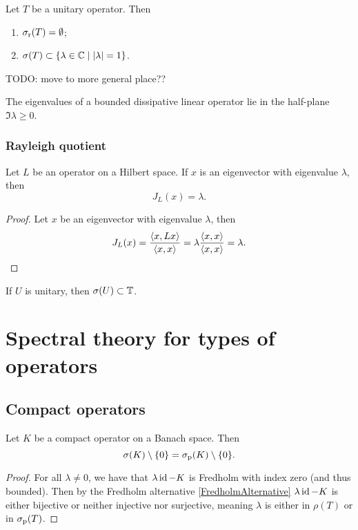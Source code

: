\begin{proposition}
Let $T$ be a unitary operator. Then
\begin{enumerate}
\item $\sigma_\text{r}(T) = \emptyset$;
\item $\sigma(T) \subset \left\{ \lambda\in\mathbb{C} \;\middle|\; |\lambda| = 1 \right\}$.
\end{enumerate}
\end{proposition}
TODO: move to more general place??

\begin{lemma}
The eigenvalues of a bounded dissipative linear operator
lie in the half-plane $\Im\lambda \geq 0$.
\end{lemma}

\subsubsection{Rayleigh quotient}
\begin{lemma}
Let $L$ be an operator on a Hilbert space. If $x$ is an eigenvector with eigenvalue $\lambda$, then
\[ J_L(x) = \lambda. \]
\end{lemma}
\begin{proof}
Let $x$ be an eigenvector with eigenvalue $\lambda$, then
\[ J_L(x) = \frac{\left\langle x,Lx \right\rangle}{\left\langle x,x \right\rangle} = \lambda \frac{\left\langle x,x \right\rangle}{\left\langle x,x \right\rangle} = \lambda. \]
\end{proof}

\begin{proposition}
If $U$ is unitary, then $\sigma(U)\subset \mathbb{T}$.
\end{proposition}

\section{Spectral theory for types of operators}
\subsection{Compact operators}

\begin{proposition}
Let $K$ be a compact operator on a Banach space. Then
\[ \sigma(K)\setminus\{0\} = \sigma_\text{p}(K)\setminus\{0\}. \]
\end{proposition}
\begin{proof}
For all $\lambda\neq 0$, we have that $\lambda\operatorname{id} - K$ is Fredholm with index zero (and thus bounded). Then by the Fredholm alternative \ref{FredholmAlternative} $\lambda\operatorname{id} - K$ is either bijective or neither injective nor surjective, meaning $\lambda$ is either in $\rho(T)$ or in $\sigma_\text{p}(T)$. 
\end{proof}

